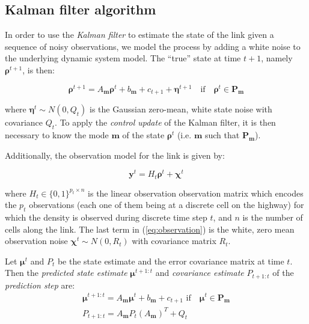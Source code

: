 \subsection{Kalman filter algorithm}

In order to use the \textit{Kalman filter} to estimate the state of the link given a sequence of noisy observations, we model the process by adding a white noise to the underlying dynamic system model. The ``true'' state at time $t+1$, namely $\boldsymbol\rho^{t+1}$, is then:

\begin{equation}
\boldsymbol\rho^{t+1} = A_{\boldsymbol m} \boldsymbol\rho^{t} + b_{\boldsymbol m} + c_{t+1} + \boldsymbol\eta^{t+1} \quad\text{if}\quad\boldsymbol\rho^{t}\in\textbf{P}_{\boldsymbol m}
\label{eq:underlyingSystemDN3}
\end{equation}

\noindent where $\boldsymbol\eta^{t}\sim N(0,Q_{t})$ is the Gaussian zero-mean, white state noise with covariance $Q_{t}$. To apply the \textit{control update} of the Kalman filter, it is then necessary to know the mode $\boldsymbol m$ of the state $\boldsymbol\rho^{t}$ (i.e. $\boldsymbol m$ such that $\textbf{P}_{\boldsymbol m}$).

Additionally, the observation model for the link is given by:

\begin{equation}
\boldsymbol y^{t} = H_{t}\boldsymbol\rho^{t} + \boldsymbol\chi^{t}
\label{eq:observation}
\end{equation}

\noindent where $H_{t}\in \{ 0,1 \}^{p_{t}\times n}$ is the linear observation observation matrix which encodes the $p_{t}$ observations (each one of them being at a discrete cell on the highway) for which the density is observed during discrete time step $t$, and $n$ is the number of cells along the link. The last term in (\ref{eq:observation}) is the white, zero mean observation noise $\boldsymbol\chi^{t} \sim N(0,R_{t})$ with covariance matrix $R_{t}$.

\noindent Let $\boldsymbol\mu^{t}$ and $P_{t}$ be the state estimate and the error covariance matrix at time $t$. Then the \emph{predicted state estimate} $\boldsymbol\mu^{t+1:t}$ and \emph{covariance estimate} $P_{t+1:t}$ of the \emph{prediction step} are:
\begin{equation}
\begin{array}{l}
\boldsymbol\mu^{t+1:t} = A_{\boldsymbol m} \boldsymbol\mu^{t} + b_{\boldsymbol m} + c_{t+1}\text{ if}\quad\boldsymbol\mu^{t}\in\textbf{P}_{\boldsymbol m}\\
P_{t+1:t} = A_{\boldsymbol m}P_{t}(A_{\boldsymbol m})^{T} + Q_{t}
\end{array}
\label{eq:predict}
\end{equation}

